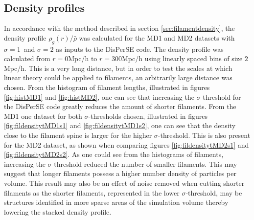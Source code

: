 \subsection{Density profiles}\label{sec:filamentdensityres}
In accordance with the method described in section \ref{sec:filamentdensity}, the density profile $\rho_g(r)/\bar{\rho}$ was calculated for the MD1 and MD2 datasets with $\sigma=1$ and $\sigma=2$ as inputs to the DisPerSE code. The density profile was calculated from $r=0$Mpc/h to $r=300$Mpc/h using linearly spaced bins of size $2$Mpc/h. This is a very long distance, but in order to test the scales at which linear theory could be applied to filaments, an arbitrarily large distance was chosen. From the histogram of filament lengths, illustrated in figures \ref{fig:histMD1} and \ref{fig:histMD2}, one can see that increasing the $\sigma$ threshold for the DisPerSE code greatly reduces the amount of shorter filaments. From the MD1 one dataset for both $\sigma$-thresholds chosen, illustrated in figures \ref{fig:fildensitytMD1s1} and \ref{fig:fildensitytMD1s2}, one can see that the density close to the filament spine is larger for the higher $\sigma$-threshold. This is also present for the MD2 dataset, as shown when comparing figures \ref{fig:fildensitytMD2s1} and \ref{fig:fildensitytMD2s2}. As one could see from the histograms of filaments, increasing the $\sigma$-threshold reduced the number of smaller filaments. This may suggest that longer filaments possess a higher number density of particles per volume. This result may also be an effect of noise removed when cutting shorter filaments as the shorter filaments, represented in the lower $\sigma$-threshold, may be structures identified in more sparse areas of the simulation volume thereby lowering the stacked density profile.\\\indent
